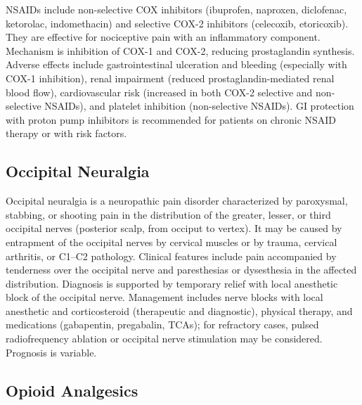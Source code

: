 NSAIDs include non-selective COX inhibitors (ibuprofen, naproxen, diclofenac, ketorolac, indomethacin) and selective COX-2 inhibitors (celecoxib, etoricoxib). They are effective for nociceptive pain with an inflammatory component. Mechanism is inhibition of COX-1 and COX-2, reducing prostaglandin synthesis. Adverse effects include gastrointestinal ulceration and bleeding (especially with COX-1 inhibition), renal impairment (reduced prostaglandin-mediated renal blood flow), cardiovascular risk (increased in both COX-2 selective and non-selective NSAIDs), and platelet inhibition (non-selective NSAIDs). GI protection with proton pump inhibitors is recommended for patients on chronic NSAID therapy or with risk factors.

\subsection{Occipital Neuralgia}
\label{sec:Occipital Neuralgia}
Occipital neuralgia is a neuropathic pain disorder characterized by paroxysmal, stabbing, or shooting pain in the distribution of the greater, lesser, or third occipital nerves (posterior scalp, from occiput to vertex). It may be caused by entrapment of the occipital nerves by cervical muscles or by trauma, cervical arthritis, or C1--C2 pathology. Clinical features include pain accompanied by tenderness over the occipital nerve and paresthesias or dysesthesia in the affected distribution. Diagnosis is supported by temporary relief with local anesthetic block of the occipital nerve. Management includes nerve blocks with local anesthetic and corticosteroid (therapeutic and diagnostic), physical therapy, and medications (gabapentin, pregabalin, TCAs); for refractory cases, pulsed radiofrequency ablation or occipital nerve stimulation may be considered. Prognosis is variable.

\subsection{Opioid Analgesics}
\label{sec:Opioid Analgesics}

